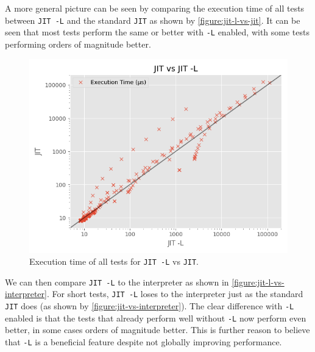 A more general picture can be seen by comparing the execution time of all tests between \texttt{JIT -L} and the standard \texttt{JIT} as shown by \autoref{figure:jit-l-vs-jit}. It can be seen that most tests perform the same or better with \texttt{-L} enabled, with some tests performing orders of magnitude better.

\begin{figure}[H]
    \centering
    \includegraphics[scale=0.75]{output/graphs/scatter/vs/JIT -L-vs-JIT-time.png}
    \caption{Execution time of all tests for \texttt{JIT -L} vs \texttt{JIT}.}
    \label{figure:jit-l-vs-jit}
\end{figure}

We can then compare \texttt{JIT -L} to the interpreter as shown in \autoref{figure:jit-l-vs-interpreter}. For short tests, \texttt{JIT -L} loses to the interpreter just as the standard \texttt{JIT} does (as shown by \autoref{figure:jit-vs-interpreter}). The clear difference with \texttt{-L} enabled is that the tests that already perform well without \texttt{-L} now perform even better, in some cases orders of magnitude better. This is further reason to believe that \texttt{-L} is a beneficial feature despite not globally improving performance.

